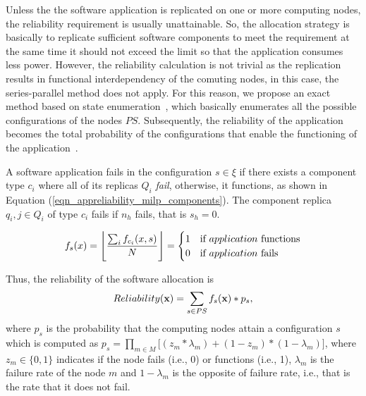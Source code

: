 Unless the the software application is replicated on one or more computing nodes, the reliability requirement is usually unattainable. So, the allocation strategy is basically to replicate sufficient software components to meet the requirement at the same time it should not exceed the limit so that the application consumes less power. However, the reliability calculation is not trivial as the replication results in functional interdependency of the comuting nodes, in this case,  the series-parallel method does not apply. For this reason, we propose an exact method based on state enumeration~\cite{ExactMethodstoComputeNetworkRe- liability}, which basically enumerates all the possible configurations of the nodes  $PS$. Subsequently, the reliability of the application becomes the total probability of the configurations that enable the functioning of the application~\cite{Mahmud5222}.
\begin{definition}
	A software application fails in the configuration $s\in\xi$ if there exists a component type $c_i$ where all of its replicas $Q_i$ \textit{fail}, otherwise, it functions, as shown in Equation (\ref{eqn_appreliability_milp_components}).  The component replica $q_i,j\in Q_i$ of type $c_i$ fails if $n_h$ fails, that is $s_h=0$.
\end{definition}
\begin{align}
f_s(x) = \floor[\Bigg]{\frac{\sum_if_{c_i}(x,s)}{N}}=
\begin{cases}
1 & \mbox{if } application \mbox{ functions}\\
0 & \mbox{if } application \mbox{ fails}
\end{cases}\label{eqn_appreliability_milp_components}
\end{align}

Thus, the reliability of the software allocation is
\begin{align}
\label{eqn_appreliability_milp}
Reliability(\x)=\sum_{s\in PS}f_s(\x)*p_s,
\end{align}
where $p_s$ is the probability that the computing nodes attain a configuration $s$ which is computed as $p_s=\prod_{m\in M}\big[(z_m*\lambda_m) + (1-z_m)*(1-\lambda_m)\big]$, where $z_m\in\{0,1\}$ indicates if the node fails (i.e., 0) or functions (i.e., 1), $\lambda_m$ is the failure rate of the node $m$ and $1-\lambda_m$ is the opposite of failure rate, i.e., that is the rate that it does not fail.
